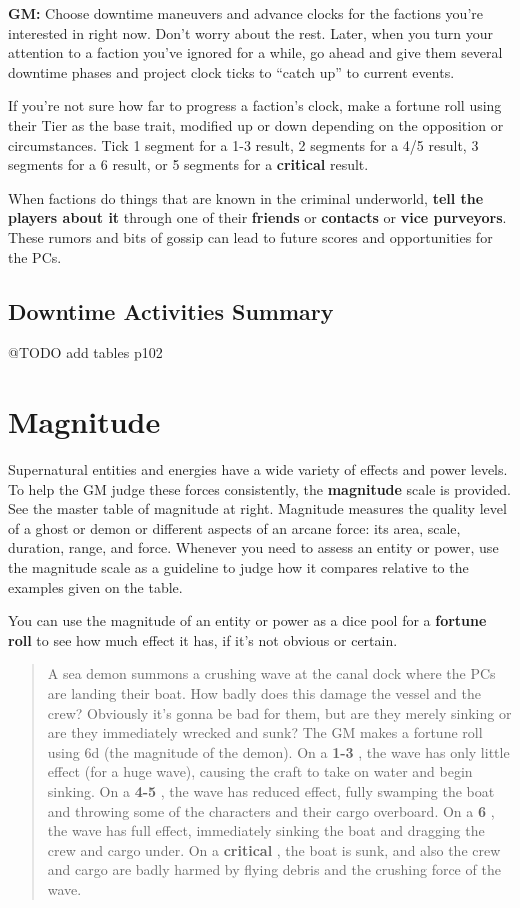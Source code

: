 \documentclass[11pt,fleqn,a5paper]{book}
\newcommand{\gameterm}[1]{\textbf{#1}}
\begin{document}
\textbf{GM:} Choose downtime maneuvers and advance clocks for the factions you’re interested in right now. Don’t worry about the rest. Later, when you turn your attention to a faction you’ve ignored for a while, go ahead and give them several downtime phases and project clock ticks to “catch up” to current events.

If you’re not sure how far to progress a faction’s clock, make a fortune roll using their Tier as the base trait, modified up or down depending on the opposition or circumstances. Tick 1 segment for a 1-3 result, 2 segments for a 4/5 result, 3 segments for a 6 result, or 5 segments for a \gameterm{critical}  result.

When factions do things that are known in the criminal underworld, \textbf{tell the players about it} through one of their \textbf{friends} or \textbf{contacts} or \textbf{vice purveyors}. These rumors and bits of gossip can lead to future scores and opportunities for the PCs.

\section{Downtime Activities Summary}

@TODO add tables p102

\chapter{Magnitude}

Supernatural entities and energies have a wide variety of effects and power levels. To help the GM judge these forces consistently, the \textbf{magnitude} scale is provided. See the master table of magnitude at right. Magnitude measures the quality level of a ghost or demon or different aspects of an arcane force: its area, scale, duration, range, and force. Whenever you need to assess an entity or power, use the magnitude scale as a guideline to judge how it compares relative to the examples given on the table.

You can use the magnitude of an entity or power as a dice pool for a \textbf{fortune roll} to see how much effect it has, if it’s not obvious or certain.

\begin{quote}
	A sea demon summons a crushing wave at the canal dock where the PCs are landing their boat. How badly does this damage the vessel and the crew? Obviously it’s gonna be bad for them, but are they merely sinking or are they immediately wrecked and sunk? The GM makes a fortune roll using 6d (the magnitude of the demon). On a \gameterm{1-3} , the wave has only little effect (for a huge wave), causing the craft to take on water and begin sinking. On a \gameterm{4-5} , the wave has reduced effect, fully swamping the boat and throwing some of the characters and their cargo overboard. On a \gameterm{6} , the wave has full effect, immediately sinking the boat and dragging the crew and cargo under. On a \gameterm{critical} , the boat is sunk, and also the crew and cargo are badly harmed by flying debris and the crushing force of the wave.
\end{quote} 
\end{document}
